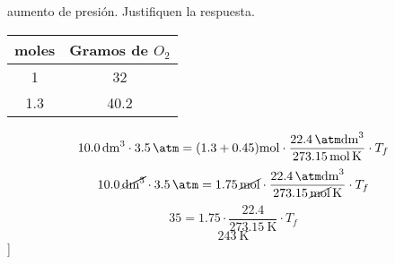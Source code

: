 \documentclass[../practica.root.tex]{subfiles}
\begin{document}
\begin{enumerate}
\begin{enumerate}
                    aumento de presión. Justifiquen la respuesta.
                    \begin{center}
                        \begin{tabular}{ c | c }
                            moles     & Gramos de $O_2$ \\
                            \hline
                            1         & 32              \\
                            \num{1,3} & \num{40,2}
                        \end{tabular}
                        \[
                            \SI{10,0}{\dm\cubed}\cdot\SI{3,5}{\atm}
                            = (\num{1,3} + \num{0,45})\si{\mole}
                            \cdot\frac{\SI{22,4}{\atm\dm\cubed}}{\SI{273,15}{\mole\kelvin}}
                            \cdot T_f
                        \]
                        \[
                            \SI{10,0}{\cancel\dm\cubed}\cdot\SI{3,5}{\cancel\atm}
                            = \SI{1,75}{\cancel\mole}
                            \cdot\frac{\SI{22,4}{\cancel\atm\cancel\dm\cubed}}{\SI{273,15}{\cancel\mole\kelvin}}
                            \cdot T_f
                        \]
                        \[ \num{35} = \SI{1,75}\cdot\frac{\num{22,4}}{\SI{273,15}{\kelvin}}\cdot T_f \]
                        \[ \boxed{\SI{243}{\kelvin}} \]]
                    \end{center}
          \end{enumerate}
\end{enumerate}
\end{document}
